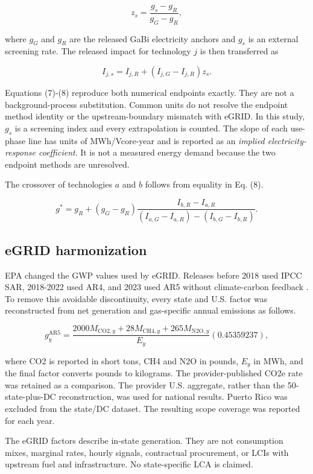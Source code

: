 \documentclass[review,12pt]{elsarticle}
\begin{document}
\[
z_s=\frac{g_s-g_R}{g_G-g_R},
\tag{7}
\]

where $g_G$ and $g_R$ are the released GaBi electricity anchors and $g_s$ is an external screening rate. The released impact for technology $j$ is then transferred as

\[
I_{j,s}=I_{j,R}+\left(I_{j,G}-I_{j,R}\right)z_s.
\tag{8}
\]

Equations (7)-(8) reproduce both numerical endpoints exactly. They are not a background-process substitution. Common units do not resolve the endpoint method identity or the upstream-boundary mismatch with eGRID. In this study, $g_s$ is a screening index and every extrapolation is counted. The slope of each use-phase line has units of MWh/Vcore-year and is reported as an \textit{implied electricity-response coefficient}. It is not a measured energy demand because the two endpoint methods are unresolved.

The crossover of technologies $a$ and $b$ follows from equality in Eq. (8).

\[
g^*=g_R+(g_G-g_R)
\frac{I_{b,R}-I_{a,R}}
{(I_{a,G}-I_{a,R})-(I_{b,G}-I_{b,R})}.
\tag{9}
\]

\subsection{eGRID harmonization}
EPA changed the GWP values used by eGRID. Releases before 2018 used IPCC SAR, 2018-2022 used AR4, and 2023 used AR5 without climate-carbon feedback \cite{ref40,ref41}. To remove this avoidable discontinuity, every state and U.S. factor was reconstructed from net generation and gas-specific annual emissions as follows.

\[
g_{y}^{\mathrm{AR5}}=
\frac{2000M_{\mathrm{CO2},y}
+28M_{\mathrm{CH4},y}
+265M_{\mathrm{N2O},y}}
{E_y}(0.45359237),
\tag{10}
\]

where CO2 is reported in short tons, CH4 and N2O in pounds, $E_y$ in MWh, and the final factor converts pounds to kilograms. The provider-published CO2e rate was retained as a comparison. The provider U.S. aggregate, rather than the 50-state-plus-DC reconstruction, was used for national results. Puerto Rico was excluded from the state/DC dataset. The resulting scope coverage was reported for each year.

The eGRID factors describe in-state generation. They are not consumption mixes, marginal rates, hourly signals, contractual procurement, or LCIs with upstream fuel and infrastructure. No state-specific LCA is claimed.
\end{document}
